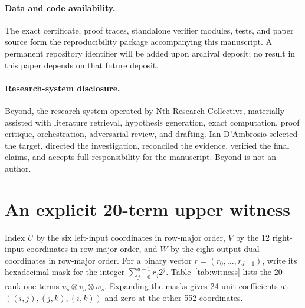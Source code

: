 \documentclass[10pt]{article}
\theoremstyle{remark}
\begin{document}
\paragraph{Data and code availability.}
The exact certificate, proof traces, standalone verifier modules, tests, and
paper source form the reproducibility package accompanying this manuscript.  A
permanent repository identifier will be added upon archival deposit; no result
in this paper depends on that future deposit.

\paragraph{Research-system disclosure.}
Beyond, the research system operated by Nth Research Collective, materially
assisted with literature retrieval, hypothesis generation, exact computation,
proof critique, orchestration, adversarial review, and drafting.  Ian
D'Ambrosio selected the target, directed the investigation, reconciled the
evidence, verified the final claims, and accepts full responsibility for the
manuscript.  Beyond is not an author.

\appendix
\section{An explicit 20-term upper witness}\label{app:witness}

Index $U$ by the six left-input coordinates in row-major order, $V$ by the 12
right-input coordinates in row-major order, and $W$ by the eight output-dual
coordinates in row-major order.  For a binary vector $r=(r_0,\ldots,r_{d-1})$,
write its hexadecimal mask for the integer $\sum_{j=0}^{d-1}r_j2^j$.
Table~\ref{tab:witness} lists the 20 rank-one terms
$u_s\otimes v_s\otimes w_s$.  Expanding the masks gives 24 unit coefficients
at $((i,j),(j,k),(i,k))$ and zero at the other 552 coordinates.
\end{document}
